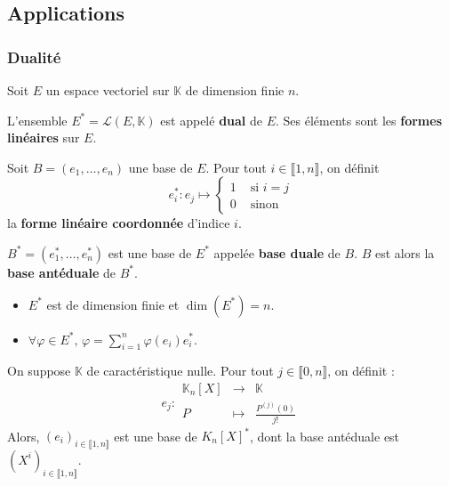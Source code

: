 	\subsection{Applications}

	\subsubsection{Dualité}

	Soit $E$ un espace vectoriel sur $\mathbb{K}$ de dimension finie $n$.

	\begin{definition}
		L'ensemble $E^* = \mathcal{L}(E, \mathbb{K})$ est appelé \textbf{dual} de $E$. Ses éléments sont les \textbf{formes linéaires} sur $E$.
	\end{definition}

	\begin{definition}
		Soit $B = (e_1, \dots, e_n)$ une base de $E$. Pour tout $i \in \llbracket 1, n \rrbracket$, on définit
		\[
		e_i^* : e_j \mapsto
		\begin{cases}
			1 &\text{ si } i = j \\
			0 &\text{ sinon}
		\end{cases}
		\]
		la \textbf{forme linéaire coordonnée} d'indice $i$.
	\end{definition}

	\begin{theorem}
		$B^* = (e_1^*, \dots, e_n^*)$ est une base de $E^*$ appelée \textbf{base duale} de $B$. $B$ est alors la \textbf{base antéduale} de $B^*$.
	\end{theorem}

	\begin{corollary}
		\begin{itemize}
			\item $E^*$ est de dimension finie et $\dim(E^*) = n$.
			\item $\forall \varphi \in E^*, \, \varphi = \sum_{i=1}^n \varphi(e_i) e_i^*$.
		\end{itemize}
	\end{corollary}


	\begin{application}
		On suppose $\mathbb{K}$ de caractéristique nulle. Pour tout $j \in \llbracket 0, n \rrbracket$, on définit :
		\[
			e_j : \begin{array}{ccc}
				\mathbb{K}_n[X] &\rightarrow& \mathbb{K} \\
				P &\mapsto& \frac{P^{(j)}(0)}{j!}
			\end{array}
		\]
		Alors, $(e_i)_{i \in \llbracket 1, n \rrbracket}$ est une base de $K_n[X]^*$, dont la base antéduale est $(X^i)_{i \in \llbracket 1, n \rrbracket}$.
	\end{application}

